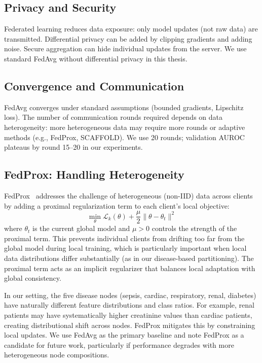 \subsection{Privacy and Security}

Federated learning reduces data exposure: only model updates (not raw data) are transmitted. Differential privacy can be added by clipping gradients and adding noise. Secure aggregation can hide individual updates from the server. We use standard FedAvg without differential privacy in this thesis.

\subsection{Convergence and Communication}

FedAvg converges under standard assumptions (bounded gradients, Lipschitz loss). The number of communication rounds required depends on data heterogeneity: more heterogeneous data may require more rounds or adaptive methods (e.g., FedProx, SCAFFOLD). We use 20 rounds; validation AUROC plateaus by round 15--20 in our experiments.

\subsection{FedProx: Handling Heterogeneity}

FedProx~\cite{li2020federated} addresses the challenge of heterogeneous (non-IID) data across clients by adding a proximal regularization term to each client's local objective:
\begin{equation}
\min_\theta \mathcal{L}_k(\theta) + \frac{\mu}{2} \|\theta - \theta_t\|^2
\end{equation}
where $\theta_t$ is the current global model and $\mu > 0$ controls the strength of the proximal term. This prevents individual clients from drifting too far from the global model during local training, which is particularly important when local data distributions differ substantially (as in our disease-based partitioning). The proximal term acts as an implicit regularizer that balances local adaptation with global consistency.

In our setting, the five disease nodes (sepsis, cardiac, respiratory, renal, diabetes) have naturally different feature distributions and class ratios. For example, renal patients may have systematically higher creatinine values than cardiac patients, creating distributional shift across nodes. FedProx mitigates this by constraining local updates. We use FedAvg as the primary baseline and note FedProx as a candidate for future work, particularly if performance degrades with more heterogeneous node compositions.

